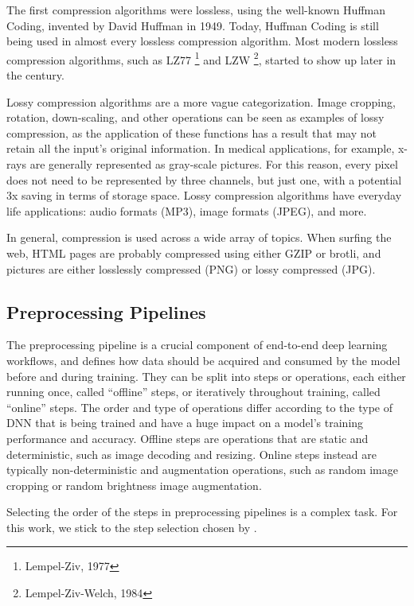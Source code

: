 \documentclass[sigconf,nonacm]{acmart}
\begin{document}
The first compression algorithms were lossless, using the well-known Huffman Coding, invented by David Huffman in 1949.
Today, Huffman Coding is still being used in almost every lossless compression algorithm.
Most modern lossless compression algorithms, such as LZ77 \footnote{Lempel-Ziv, 1977} and LZW \footnote{Lempel-Ziv-Welch, 1984}, started to show up later in the century.

Lossy compression algorithms are a more vague categorization.
Image cropping, rotation, down-scaling, and other operations can be seen as examples of lossy compression, as the application of these functions has a result that may not retain all the input's original information.
In medical applications, for example, x-rays are generally represented as gray-scale pictures.
For this reason, every pixel does not need to be represented by three channels, but just one, with a potential 3x saving in terms of storage space.
Lossy compression algorithms have everyday life applications: audio formats (MP3), image formats (JPEG), and more.

In general, compression is used across a wide array of topics.
When surfing the web, HTML pages are probably compressed using either GZIP or brotli, and pictures are either losslessly compressed (PNG) or lossy compressed (JPG).

\subsection{Preprocessing Pipelines}
The preprocessing pipeline is a crucial component of end-to-end deep learning workflows, and defines how data should be acquired and consumed by the model before and during training.
They can be split into steps or operations, each either running once, called ``offline'' steps, or iteratively throughout training, called ``online'' steps.
The order and type of operations differ according to the type of DNN that is being trained and have a huge impact on a model's training performance and accuracy.
Offline steps are operations that are static and deterministic, such as image decoding and resizing.
Online steps instead are typically non-deterministic and augmentation operations, such as random image cropping or random brightness image augmentation.

Selecting the order of the steps in preprocessing pipelines is a complex task.
For this work, we stick to the step selection chosen by \cite{isenko2022bottleneck}.
\end{document}
